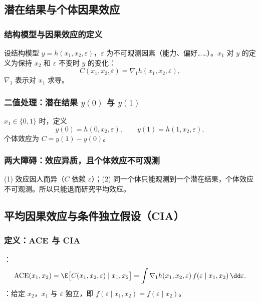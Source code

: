\subsection{潜在结果与个体因果效应}

\subsubsection{结构模型与因果效应的定义}

设结构模型 $y=h(x_1,x_2,\varepsilon)$，$\varepsilon$ 为不可观测因素（能力、偏好……）。$x_1$ 对 $y$ 的定义为保持 $x_2$ 和 $\varepsilon$ 不变时 $y$ 的变化：
\[
C(x_1,x_2,\varepsilon)=\nabla_1h(x_1,x_2,\varepsilon),
\]
$\nabla_1$ 表示对 $x_1$ 求导。

\subsubsection{二值处理：潜在结果 \texorpdfstring{$y(0)$}{y(0)} 与 \texorpdfstring{$y(1)$}{y(1)}}

$x_1\in\{0,1\}$ 时，定义
\[
y(0)=h(0,x_2,\varepsilon),\qquad y(1)=h(1,x_2,\varepsilon),
\]
个体效应为 $C=y(1)-y(0)$。

\subsubsection{两大障碍：效应异质，且个体效应不可观测}

(1) 效应因人而异（$C$ 依赖 $\varepsilon$）；(2) 同一个体只能观测到一个潜在结果，个体效应不可观测。所以只能退而研究平均效应。

\subsection{平均因果效应与条件独立假设（CIA）}

\subsubsection{定义：ACE 与 CIA}

\begin{defn}\label{def:U02-ace}
：
\[
\mathrm{ACE}(x_1,x_2)=\E\big[C(x_1,x_2,\varepsilon)\mid x_1,x_2\big]=\int\nabla_1h(x_1,x_2,\varepsilon)\,f(\varepsilon\mid x_1,x_2)\,\dd\varepsilon.
\]
：给定 $x_2$，$x_1$ 与 $\varepsilon$ 独立，即 $f(\varepsilon\mid x_1,x_2)=f(\varepsilon\mid x_2)$。
\end{defn}

